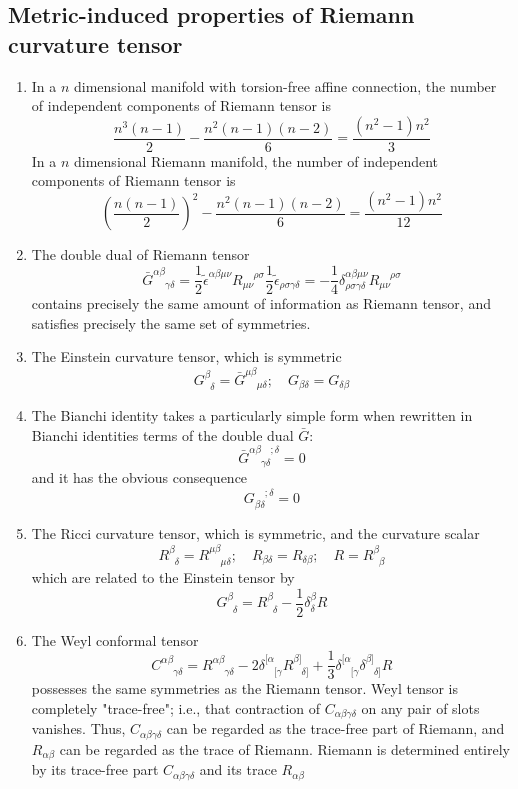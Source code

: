 \subsection{Metric-induced properties of Riemann curvature tensor}
\begin{enumerate}
\item In a $n$ dimensional manifold with torsion-free affine connection, the number of independent components of Riemann tensor is \[\frac{n^3(n-1)}{2} - \frac{n^2(n-1)(n-2)}{6} = \frac{(n^2-1)n^2}{3}\]
In a $n$ dimensional Riemann manifold,  the number of independent components of Riemann tensor is \[(\frac{n(n-1)}{2})^2 -\frac{n^2(n-1)(n-2)}{6} = \frac{(n^2-1)n^2}{12} \]
\item  The double dual of Riemann tensor
\[\bar{G}^{\alpha \beta}_{\phantom{\alpha \beta} \gamma \delta} = \frac{1}{2} \tilde{\epsilon}^{\alpha \beta \mu \nu} R_{\mu \nu}^{\phantom{\mu \nu} \rho \sigma} \frac{1}{2} \tilde{\epsilon}_{\rho \sigma \gamma \delta} = -\frac{1}{4} \delta^{\alpha \beta \mu \nu}_{\rho \sigma \gamma \delta} R_{\mu \nu}^{\phantom{\mu \nu} \rho \sigma} \]
contains precisely the same amount of information as
Riemann tensor, and satisfies precisely the same set of symmetries.
\item The Einstein curvature tensor, which is symmetric
\[G^{\beta}_{\phantom{\beta}\delta} = \bar{G}^{\mu \beta}_{\phantom{\mu \beta} \mu \delta}; \quad G_{\beta \delta}=G_{\delta \beta}\]
\item The Bianchi identity takes a particularly simple form when rewritten in Bianchi identities terms of the double dual $\bar{G}$:
\[\bar{G}^{\alpha \beta \phantom{\gamma \delta};\delta}_{\phantom{\alpha \beta} \gamma \delta} = 0\]
and it has the obvious consequence
\[G_{\beta \delta}^{\phantom{\beta \delta};\delta} = 0\]
\item The Ricci curvature tensor, which is symmetric, and the curvature scalar
\[R^{\beta}_{\phantom{\beta}\delta} = R^{\mu \beta}_{\phantom{\mu \beta} \mu \delta}; \quad R_{\beta \delta}=R_{\delta \beta};\quad R = R^{\beta}_{\phantom{\beta}\beta}\]
which are related to the Einstein tensor by 
\[G^{\beta}_{\phantom{\beta}\delta} =  R^{\beta}_{\phantom{\beta}\delta} - \frac{1}{2} \delta^{\beta}_{\delta}R\]
\item The Weyl conformal tensor
\[C^{\alpha \beta}_{\phantom{\alpha \beta} \gamma \delta} = R^{\alpha \beta}_{\phantom{\alpha \beta} \gamma \delta} -2 \delta^{[\alpha}_{\phantom{[\alpha}[\gamma} R^{\beta]}_{\phantom{\beta]}\delta]} + \frac{1}{3} \delta^{[\alpha}_{\phantom{[\alpha}[\gamma} \delta^{\beta]}_{\phantom{\beta]}\delta]} R \]
possesses the same symmetries as the Riemann tensor. 
Weyl tensor is completely "trace-free"; i.e., that
contraction of $C_{\alpha \beta \gamma \delta}$ on any pair of slots vanishes. Thus, $C_{\alpha \beta \gamma \delta}$ can be regarded as the trace-free part of Riemann, and $R_{\alpha \beta}$ can be regarded as the trace of Riemann. Riemann is determined entirely by its trace-free part $C_{\alpha \beta \gamma \delta}$ and
its trace $R_{\alpha \beta}$
\end{enumerate}

